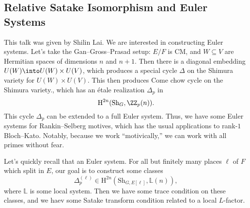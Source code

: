 \documentclass{article}
\begin{document}
\subsection{Relative Satake Isomorphism and Euler Systems}
This talk was given by Shilin Lai. We are interested in constructing Euler systems. Let's take the Gan--Gross--Prasad setup: $E/F$ is CM, and $W\subseteq V$ are Hermitian spaces of dimensions $n$ and $n+1$. Then there is a diagonal embedding $U(W)\into U(W)\times U(V)$, which produces a special cycle $\Delta$ on the Shimura variety for $U(W)\times U(V)$. This then produces Come chow cycle on the Shimura variety., which has an \'etale realization $\Delta_p$ in
\[\mathrm H^{2n}(\mathrm{Sh}_G,\ZZ_p(n)).\]
This cycle $\Delta_p$ can be extended to a full Euler system. Thus, we have some Euler systems for Rankin--Selberg motives, which has the usual applications to rank-$1$ Bloch--Kato. Notably, because we work ``motivically,'' we can work with all primes without fear.

Let's quickly recall that an Euler system. For all but finitely many places $\ell$ of $F$ which split in $E$, our goal is to construct some classes
\[\Delta_p^{(\ell)}\in\mathrm H^{2n}(\mathrm{Sh}_{G,E[\ell]},\mathbb L(n)),\]
where $\mathbb L$ is some local system. Then we have some trace condition on these classes, and we haev some Satake transform condition related to a local $L$-factor.
\end{document}
